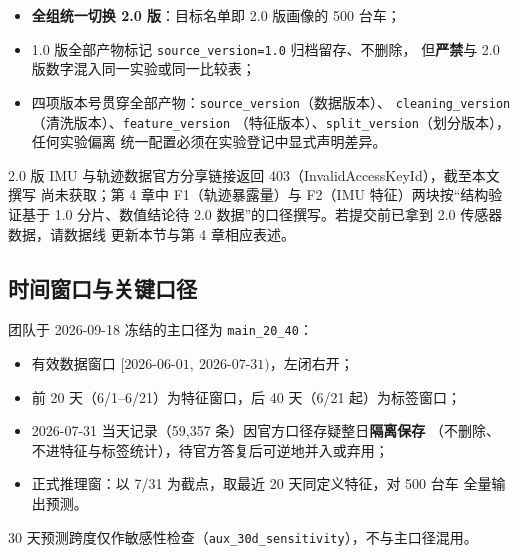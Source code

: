 \begin{itemize}
  \item \textbf{全组统一切换 2.0 版}：目标名单即 2.0 版画像的 500 台车；
  \item 1.0 版全部产物标记 \texttt{source\_version=1.0} 归档留存、不删除，
        但\textbf{严禁}与 2.0 版数字混入同一实验或同一比较表；
  \item 四项版本号贯穿全部产物：\texttt{source\_version}（数据版本）、
        \texttt{cleaning\_version}（清洗版本）、\texttt{feature\_version}
        （特征版本）、\texttt{split\_version}（划分版本），任何实验偏离
        统一配置必须在实验登记中显式声明差异。
\end{itemize}

\begin{TODO}
2.0 版 IMU 与轨迹数据官方分享链接返回 403（InvalidAccessKeyId），截至本文撰写
尚未获取；第 4 章中 F1（轨迹暴露量）与 F2（IMU 特征）两块按“结构验证基于 1.0
分片、数值结论待 2.0 数据”的口径撰写。若提交前已拿到 2.0 传感器数据，请数据线
更新本节与第 4 章相应表述。
\end{TODO}

\subsection{时间窗口与关键口径}

团队于 2026-09-18 冻结的主口径为 \texttt{main\_20\_40}：
\begin{itemize}
  \item 有效数据窗口 $[\text{2026-06-01},\ \text{2026-07-31})$，左闭右开；
  \item 前 20 天（6/1--6/21）为特征窗口，后 40 天（6/21 起）为标签窗口；
  \item 2026-07-31 当天记录（59{,}357 条）因官方口径存疑整日\textbf{隔离保存}
        （不删除、不进特征与标签统计），待官方答复后可逆地并入或弃用；
  \item 正式推理窗：以 7/31 为截点，取最近 20 天同定义特征，对 500 台车
        全量输出预测。
\end{itemize}
30 天预测跨度仅作敏感性检查（\texttt{aux\_30d\_sensitivity}），不与主口径混用。
